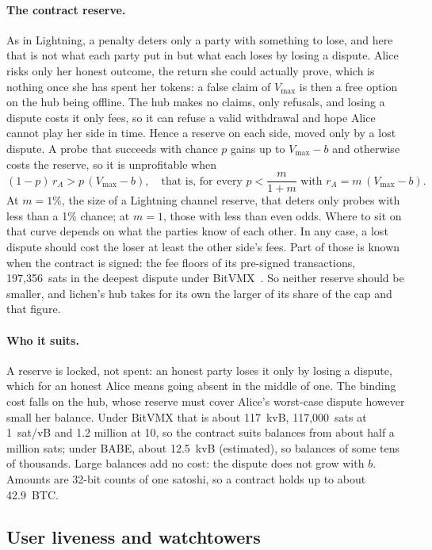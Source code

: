 \documentclass[11pt]{article}
\newcommand{\vmax}{V_{\max}}
\begin{document}
\paragraph{The contract reserve.} As in Lightning, a penalty deters only
a party with something to lose, and here that is not what each party put
in but what each loses by losing a dispute. Alice risks only her honest
outcome, the return she could actually prove, which is nothing once she
has spent her tokens: a false claim of $\vmax$ is then a free option on
the hub being offline. The hub makes no claims, only refusals, and
losing a dispute costs it only fees, so it can refuse a valid withdrawal
and hope Alice cannot play her side in time. Hence a reserve on each
side, moved only by a lost dispute. A probe that succeeds with chance
$p$ gains up to $\vmax - b$ and otherwise costs the reserve, so it is
unprofitable when
\[
  (1-p)\, r_A > p\,(\vmax - b), \quad\text{that is, for every } p < \frac{m}{1+m} \text{ with } r_A = m\,(\vmax - b).
\]
At $m = 1\%$, the size of a Lightning channel reserve, that deters only
probes with less than a 1\% chance; at $m = 1$, those with less than even
odds. Where to sit on that curve depends on what the parties know of
each other. In any case, a lost dispute should cost the loser at least
the other side's fees. Part of those is known when the contract is
signed: the fee floors of its pre-signed transactions, 197,356~sats in
the deepest dispute under BitVMX~\cite[\S 6]{lichenbitvmx}. So neither
reserve should be smaller, and lichen's hub takes for its own the larger
of its share of the cap and that figure.

\paragraph{Who it suits.} A reserve is locked, not spent: an honest
party loses it only by losing a dispute, which for an honest Alice means
going absent in the middle of one. The binding cost falls on the hub,
whose reserve must cover Alice's worst-case dispute however small her
balance. Under BitVMX that is about 117~kvB, 117,000~sats at 1~sat/vB
and 1.2 million at 10, so the contract suits balances from about half a
million sats; under BABE, about 12.5~kvB (estimated), so balances of some
tens of thousands. Large balances add no cost: the dispute does not grow
with $b$. Amounts are 32-bit counts of one satoshi, so a contract holds
up to about 42.9~BTC.

\subsection{User liveness and watchtowers}
\label{sec:watch}
\end{document}
